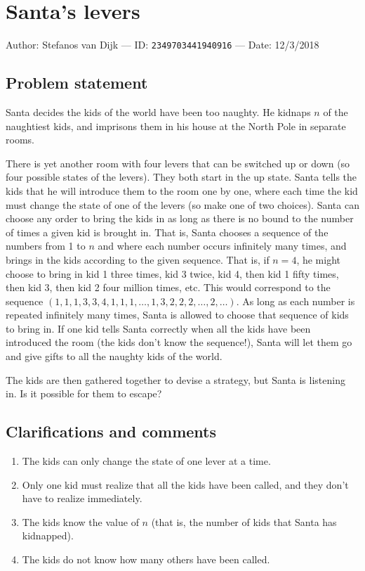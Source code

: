 
\section{Santa's levers}

Author: Stefanos van Dijk --- ID: \verb`2349703441940916` --- Date: 12/3/2018

\subsection{Problem statement}

Santa decides the kids of the world have been too naughty. He kidnaps $n$ of the naughtiest kids, and imprisons them in his house at the North Pole in separate rooms.

There is yet another room with four levers that can be switched up or down (so four possible states of the levers). They both start in the up state. Santa tells the kids that he will introduce them to the room one by one, where each time the kid must change the state of one of the levers (so make one of two choices). Santa can choose any order to bring the kids in as long as there is no bound to the number of times a given kid is brought in. That is, Santa chooses a sequence of the numbers from 1 to $n$ and where each number occurs infinitely many times, and brings in the kids according to the given sequence. That is, if $n=4$, he might choose to bring in kid 1 three times, kid 3 twice, kid 4, then kid 1 fifty times, then kid 3, then kid 2 four million times, etc. This would correspond to the sequence $(1,1,1,3,3,4,1,1,1,\ldots,1,3,2,2,2,\ldots,2,\ldots)$. As long as each number is repeated infinitely many times, Santa is allowed to choose that sequence of kids to bring in. If one kid tells Santa correctly when all the kids have been introduced the room (the kids don't know the sequence!), Santa will let them go and give gifts to all the naughty kids of the world.

The kids are then gathered together to devise a strategy, but Santa is listening in. Is it possible for them to escape?

\subsection{Clarifications and comments}

\begin{enumerate}
  \item The kids can only change the state of one lever at a time.
  \item Only one kid must realize that all the kids have been called, and they don't have to realize immediately.
  \item The kids know the value of $n$ (that is, the number of kids that Santa has kidnapped).
  \item The kids do not know how many others have been called.
\end{enumerate}

